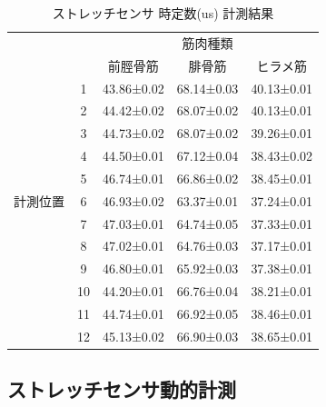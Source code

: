 \begin{table}[h]
    \caption{ストレッチセンサ 時定数(us) 計測結果}
    \label{4_2}
        \begin{center}
            \begin{tabular}{|c|c|ccc|}\hline
            \multicolumn{2}{|c|}{} & \multicolumn{3}{c|}{筋肉種類}\\
            \cline{3-5}
            \multicolumn{2}{|c|}{} & 前脛骨筋 & 腓骨筋 & ヒラメ筋 \\ \hline
            & 1 & 43.86±0.02 & 68.14±0.03 & 40.13±0.01 \\ \cline{2-5}
            & 2 & 44.42±0.02 & 68.07±0.02 & 40.13±0.01 \\ \cline{2-5}
            & 3 & 44.73±0.02 & 68.07±0.02 & 39.26±0.01 \\ \cline{2-5}
            & 4 & 44.50±0.01 & 67.12±0.04 & 38.43±0.02 \\ \cline{2-5}
            & 5 & 46.74±0.01 & 66.86±0.02 & 38.45±0.01 \\ \cline{2-5}
            計測位置 & 6 & 46.93±0.02 & 63.37±0.01 & 37.24±0.01 \\ \cline{2-5}
            & 7 & 47.03±0.01 & 64.74±0.05 & 37.33±0.01 \\ \cline{2-5}
            & 8 & 47.02±0.01 & 64.76±0.03 & 37.17±0.01 \\ \cline{2-5}
            & 9 & 46.80±0.01 & 65.92±0.03 & 37.38±0.01 \\ \cline{2-5}
            & 10 & 44.20±0.01 & 66.76±0.04 & 38.21±0.01 \\ \cline{2-5}
            & 11 & 44.74±0.01 & 66.92±0.05 & 38.46±0.01 \\ \cline{2-5}
            & 12 & 45.13±0.02 & 66.90±0.03 & 38.65±0.01 \\ \hline
        \end{tabular}
    \end{center}
\end{table}

\subsection{ストレッチセンサ動的計測}

